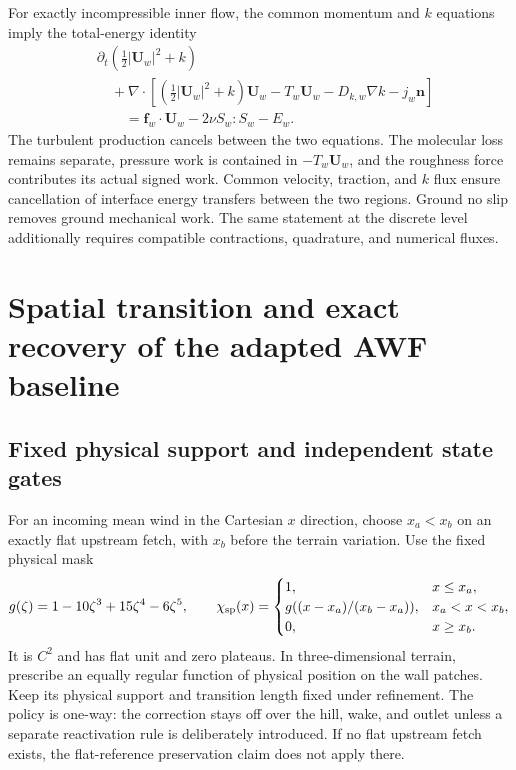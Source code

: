 \documentclass[11pt,a4paper]{article}
\numberwithin{equation}{section}
\begin{document}
For exactly incompressible inner flow, the common momentum and
$k$ equations imply the total-energy identity
\begin{equation}
 \begin{aligned}
 &\partial_t\left(\tfrac12|\boldsymbol U_w|^2+k\right)\\
 &\quad+\nabla\cdot\left[
   (\tfrac12|\boldsymbol U_w|^2+k)\boldsymbol U_w
   -T_w\boldsymbol U_w-D_{k,w}\nabla k-j_w\boldsymbol n
                  \right]\\
 &\qquad=\boldsymbol f_w\cdot\boldsymbol U_w-2\nu S_w:S_w-E_w .
 \end{aligned}
 \label{geo:total-energy}
\end{equation}
The turbulent production cancels between the two equations.  The
molecular loss remains separate, pressure work is contained in
$-T_w\boldsymbol U_w$, and the roughness force contributes its
actual signed work.  Common velocity, traction, and $k$ flux ensure
cancellation of interface energy transfers between the two regions.
Ground no slip removes ground mechanical work.  The same statement
at the discrete level additionally requires compatible contractions,
quadrature, and numerical fluxes.

\section{Spatial transition and exact recovery of the adapted AWF baseline}
\label{geo:transition}

\subsection{Fixed physical support and independent state gates}

For an incoming mean wind in the Cartesian $x$ direction, choose
$x_a<x_b$ on an exactly flat upstream fetch, with $x_b$ before the
terrain variation.  Use the fixed physical mask
\begin{equation}
 g(\zeta)=1-10\zeta^3+15\zeta^4-6\zeta^5,\qquad
 \chi_{\rm sp}(x)=
 \begin{cases}
 1,&x\leq x_a,\\
 g((x-x_a)/(x_b-x_a)),&x_a<x<x_b,\\
 0,&x\geq x_b.
 \end{cases}
 \label{geo:spatial-mask}
\end{equation}
It is $C^2$ and has flat unit and zero plateaus.  In three-dimensional
terrain, prescribe an equally regular function of physical position
on the wall patches.  Keep its physical support and transition length
fixed under refinement.  The policy is one-way: the correction stays
off over the hill, wake, and outlet unless a separate reactivation
rule is deliberately introduced.  If no flat upstream fetch exists,
the flat-reference preservation claim does not apply there.
\end{document}
